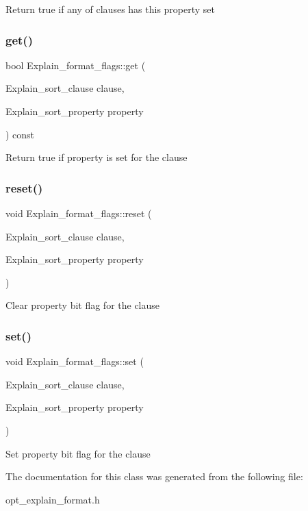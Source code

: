 Return true if any of clauses has this property set \mbox{\label{classExplain__format__flags_a02a34aa848f79ddca0b8c296e32379f6}} 
\subsubsection{\texorpdfstring{get()}{get()}}
{\footnotesize\ttfamily bool Explain\+\_\+format\+\_\+flags\+::get (\begin{DoxyParamCaption}\item[{Explain\+\_\+sort\+\_\+clause}]{clause,  }\item[{Explain\+\_\+sort\+\_\+property}]{property }\end{DoxyParamCaption}) const\hspace{0.3cm}{\ttfamily [inline]}}

Return true if property is set for the clause \mbox{\label{classExplain__format__flags_a9bf50161cba3d55f4fab126cacd7531d}} 
\subsubsection{\texorpdfstring{reset()}{reset()}}
{\footnotesize\ttfamily void Explain\+\_\+format\+\_\+flags\+::reset (\begin{DoxyParamCaption}\item[{Explain\+\_\+sort\+\_\+clause}]{clause,  }\item[{Explain\+\_\+sort\+\_\+property}]{property }\end{DoxyParamCaption})\hspace{0.3cm}{\ttfamily [inline]}}

Clear property bit flag for the clause \mbox{\label{classExplain__format__flags_afe772a223c5a9a59534f7e5a32a9367c}} 
\subsubsection{\texorpdfstring{set()}{set()}}
{\footnotesize\ttfamily void Explain\+\_\+format\+\_\+flags\+::set (\begin{DoxyParamCaption}\item[{Explain\+\_\+sort\+\_\+clause}]{clause,  }\item[{Explain\+\_\+sort\+\_\+property}]{property }\end{DoxyParamCaption})\hspace{0.3cm}{\ttfamily [inline]}}

Set property bit flag for the clause 

The documentation for this class was generated from the following file\+:\begin{DoxyCompactItemize}
\item 
opt\+\_\+explain\+\_\+format.\+h\end{DoxyCompactItemize}
